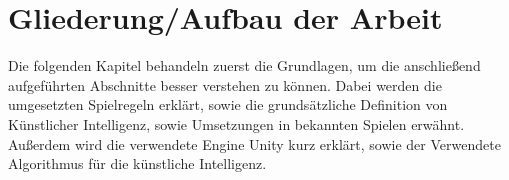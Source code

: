 

\section{Gliederung/Aufbau der Arbeit}
\label{ch:Einleitung:sec:Gliederung}


Die folgenden Kapitel behandeln zuerst die Grundlagen, um die anschließend aufgeführten Abschnitte besser verstehen zu können. Dabei werden die umgesetzten Spielregeln erklärt, sowie die grundsätzliche Definition von Künstlicher Intelligenz, sowie Umsetzungen in bekannten Spielen erwähnt. Außerdem wird die verwendete Engine Unity kurz erklärt, sowie der Verwendete Algorithmus für die künstliche Intelligenz. 

